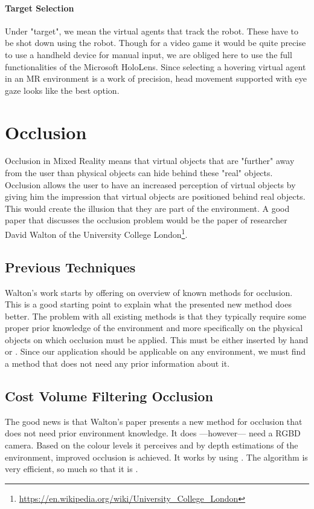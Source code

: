 \paragraph{Target Selection}
Under "target", we mean the virtual agents that track the robot. These have to be shot down using the robot. Though for a video game it would be quite precise to use a handheld device for manual input, we are obliged here to use the full functionalities of the Microsoft HoloLens. Since selecting a hovering virtual agent in an MR environment is a work of precision, head movement supported with eye gaze looks like the best option.

\newpage
\section{Occlusion}
Occlusion in Mixed Reality means  that virtual objects that are "further" away from the user than physical objects can hide behind these "real" objects.  Occlusion allows the user to have an increased perception of virtual objects by giving him the impression that virtual objects are positioned behind real objects. This would create the illusion that they are part of the environment\cite{dubois2009engineering}. A good paper that discusses the occlusion problem would be the paper\cite{walton2017accurate} of researcher David Walton of the University College London\footnote{\url{https://en.wikipedia.org/wiki/University_College_London}}.

\subsection{Previous Techniques}
Walton's work\cite{walton2017accurate} starts by offering on overview of known methods for occlusion. This is a good starting point to explain what the presented new method does better.
The problem with all existing methods is that they typically require some proper prior knowledge of the environment and more specifically on the physical objects on which occlusion must be applied. This must be either inserted by hand or . Since our application should be applicable on any environment, we must find a method that does not need any prior information about it.

\subsection{Cost Volume Filtering Occlusion}
The good news is that Walton's paper\cite{walton2017accurate} presents a new method for occlusion that does not need prior environment knowledge. It does ---however--- need a RGBD camera. Based on the colour levels it perceives and by depth estimations of the environment, improved occlusion is achieved.\newline
It works by using . The algorithm is very efficient, so much so that it is .


